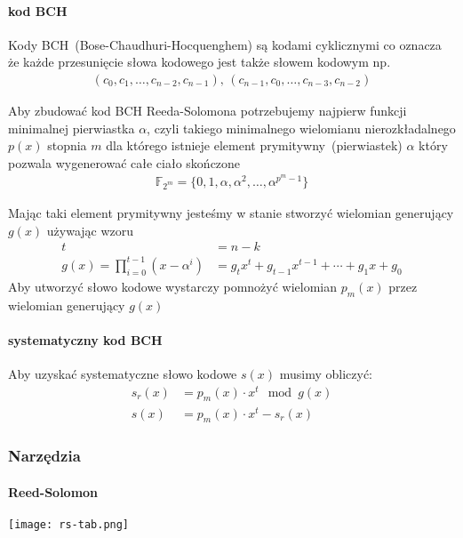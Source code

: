 \paragraph{kod BCH}

Kody BCH~(Bose-Chaudhuri-Hocquenghem) są kodami cyklicznymi co oznacza że każde przesunięcie słowa kodowego jest także słowem kodowym np.
\begin{align*}
    (c_0, c_1,\ldots, c_{n-2}, c_{n-1})\text{, }(c_{n-1}, c_0, \ldots, c_{n-3}, c_{n-2})
\end{align*}

Aby zbudować kod BCH Reeda-Solomona potrzebujemy najpierw funkcji minimalnej pierwiastka $\alpha$, czyli takiego minimalnego wielomianu nierozkładalnego $p(x)$ stopnia $m$ dla którego istnieje element prymitywny~(pierwiastek) $\alpha$ który pozwala wygenerować całe ciało skończone
\begin{align*}
    \mathbb{F}_{2^m} = \{0, 1, \alpha, \alpha^2, \ldots, \alpha^{p^{m}-1} \}
\end{align*}

Mając taki element prymitywny jesteśmy w stanie stworzyć wielomian generujący $g(x)$ używając wzoru
\begin{align*}
    t &= n - k \\
    g(x) = \prod_{i=0}^{t-1} (x - \alpha^i) &= g_{t}x^t + g_{t-1}x^{t-1} +
    \cdots + g_{1}x + g_{0}
\end{align*}
Aby utworzyć słowo kodowe wystarczy pomnożyć wielomian $p_m(x)$ przez wielomian generujący $g(x)$

\paragraph{systematyczny kod BCH}

Aby uzyskać systematyczne słowo kodowe $s(x)$ musimy obliczyć:
\begin{align*}
    s_r(x) &= p_m(x) \cdot x^t \mod g(x) \\
    s(x) &= p_m(x) \cdot x^t - s_r(x)
\end{align*}

\subsubsection{Narzędzia}
\paragraph{Reed-Solomon}
\texttt{[image: rs-tab.png]}

